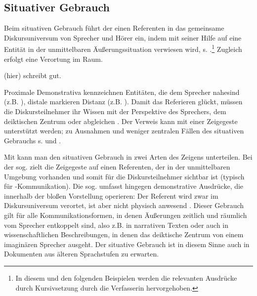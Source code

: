 \subsection{Situativer Gebrauch}\label{sec:situativ}\largerpage

Beim situativen  Gebrauch \parencite[auch deiktischer Gebrauch, z.B. bei][]{Bisle-Muller1991,Consten2004,Studler2011} führt der  einen Referenten in das gemeinsame Diskursuniversum von Sprecher und Hörer ein, indem mit seiner Hilfe auf eine Entität in der unmittelbaren Äußerungssituation verwiesen wird, s. .\footnote{In diesem und den folgenden Beispielen werden die relevanten Ausdrücke durch Kursivsetzung durch die Verfasserin hervorgehoben.}  Zugleich erfolgt eine Verortung im Raum.

\begin{exe}
	\ex \label{ex:deikt}  (hier) schreibt gut.
\end{exe}

Proximale Demonstrativa  kennzeichnen Entitäten, die dem Sprecher nahe\linebreak sind (z.B. ), distale markieren Distanz (z.B. ).
Damit das Referieren glückt, müssen die Diskursteilnehmer ihr Wissen mit der Perspektive des Sprechers, dem deiktischen Zentrum oder   \parencite{Buhler1934} abgleichen  \parencite[s. auch][327--330]{Hoffmann2009}. Der Verweis kann mit einer Zeigegeste unterstützt werden; zu Ausnahmen und weniger zentralen Fällen des situativen  Gebrauchs s. \textcite[94--95]{Diessel1999} und \textcite[219--224]{Himmelmann1996}. 

Mit \textcite[]{Buhler1934} kann man den situativen  Gebrauch in zwei Arten des Zeigens unterteilen. Bei der sog.  zielt die Zeigegeste auf einen Referenten, der in der unmittelbaren Umgebung vorhanden und somit für die Diskursteilnehmer sichtbar ist (typisch für -Kommunikation). Die sog.  umfasst hingegen demonstrative Ausdrücke, die innerhalb der bloßen Vorstellung operieren: Der Referent wird zwar im Diskursuniversum verortet, ist aber nicht physisch anwesend \parencite[s. auch][222]{Himmelmann1996}. Dieser Gebrauch gilt für alle Kommunikationsformen, in denen Äußerungen zeitlich und räumlich vom Sprecher entkoppelt sind, also z.B. in narrativen Texten \parencite[95]{Diessel1999} oder auch in wissenschaftlichen Beschreibungen, in denen das deiktische Zentrum von einem imaginären Sprecher ausgeht. Der situative  Gebrauch ist in diesem Sinne auch in Dokumenten aus älteren Sprachstufen zu erwarten. 

